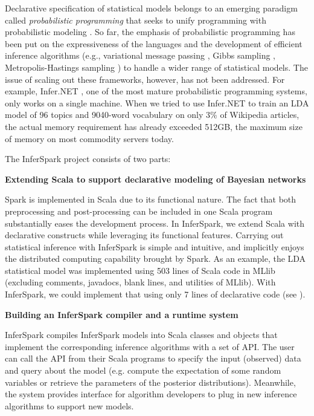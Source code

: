 Declarative specification of statistical models belongs to an emerging paradigm
called {\em probabilistic programming} that seeks to unify programming with
probabilistic modeling .
So far, the emphasis of probabilistic programming has been put on the
expressiveness of the languages and the development of efficient inference
algorithms (e.g., variational message passing , Gibbs sampling ,
Metropolis-Hastings sampling ) to handle a wider range of statistical
models. The issue of scaling out these frameworks, however, has not been
addressed. For example, Infer.NET , one of the most
mature probabilistic programming systems, only works on a single machine.  
When we tried to use Infer.NET to train an LDA model of 96 topics and 9040-word
vocabulary on only 3\% of Wikipedia articles, the actual memory
requirement has already exceeded 512GB, the maximum size of memory on most commodity
servers today.

The InferSpark project consists of two parts:
\begin{packed_enum}
	\item {\bf Extending Scala to support declarative modeling of
	Bayesian networks}

	Spark is implemented in Scala due to its functional nature.
The fact that both preprocessing and post-processing can be 
included in one Scala program substantially eases the development process.
	In InferSpark, we extend Scala with declarative constructs 
	while leveraging its functional features.  
	Carrying out statistical inference with InferSpark
	is simple and intuitive, and implicitly enjoys the distributed computing
	capability brought by Spark.  As an example, the LDA statistical model 
	was implemented using 503 lines of Scala code in MLlib 
	(excluding comments,
	javadocs, blank lines, and utilities of MLlib).  
	With InferSpark, we could implement that using only 7 lines 
	of declarative code (see ). 
	

	\item {\bf Building an InferSpark compiler and a runtime system}
		
	InferSpark compiles InferSpark models into Scala classes
	and objects that implement the corresponding inference algorithms 
	with a set of API. 
	The user can call the API from their Scala programs to 
	specify the input (observed) data and query about the model 
	(e.g. compute the expectation of
	some random variables or retrieve the parameters of the posterior
	distributions). Meanwhile, the system provides interface for
	algorithm developers to plug in new inference algorithms to support
	new models.
		
\end{packed_enum}


